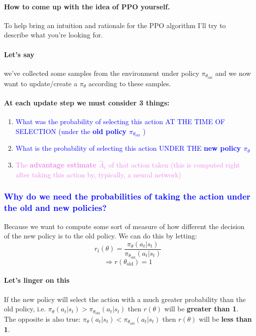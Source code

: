 \documentclass{article}
\begin{document}
\paragraph{How to come up with the idea of PPO yourself.} To help bring an intuition and rationale for the PPO algorithm I'll try to describe what you're looking for.

\paragraph{Let's say} we've collected some samples from the environment under policy \( \pi_{\theta_{\text{old}}} \) and we now want to update/create a \( \pi_\theta\) according to these samples.

\paragraph{At each update step we must consider 3 things:}
\begin{enumerate}
    \item \textcolor{blue}{ What was the probability of selecting this action AT THE TIME OF SELECTION (under the \textbf{old policy \( \pi_{\theta_{\text{old}}} \)} ) }
    \item \textcolor{blue}{What is the probability of selecting this action UNDER THE \textbf{new policy \( \pi_\theta\) } }
    \item \textcolor{violet}{The \textbf{advantage estimate \( \hat{A}_t \)} of that action taken (this is computed right after taking this action by, typically, a neural network)}
\end{enumerate}

\textcolor{blue}{\subsubsection{Why do we need the probabilities of taking the action under the old and new policies?}}
Because we want to compute some sort of measure of how different the decision of the new policy is to the old policy. We can do this by letting:
\[r_t(\theta) = \frac{\pi_\theta (a_t | s_t)}{\pi_{\theta_{\text{old}}} (a_t | s_t)}\]
\[\Rightarrow r(\theta_\text{old}) = 1\]

\paragraph{Let's linger on this} If the new policy will select the action with a much greater probability than the old policy, i.e. \(\pi_\theta (a_t | s_t) > \pi_{\theta_{\text{old}}} (a_t | s_t)\) then \(r(\theta)\) will be \textbf{greater than 1}. \\ The opposite is also true: \(\pi_\theta (a_t | s_t) < \pi_{\theta_{\text{old}}} (a_t | s_t)\) then \(r(\theta)\) will be \textbf{less than 1}.
\end{document}
